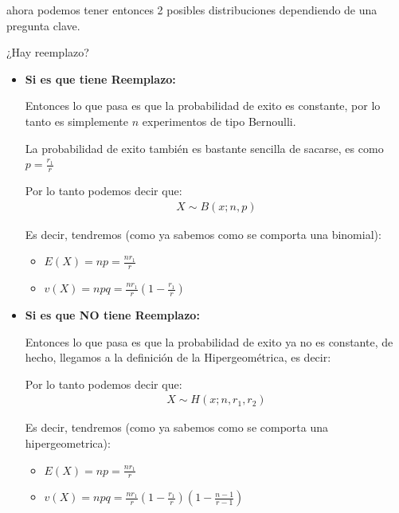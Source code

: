 \documentclass[12pt, fleqn]{report}                             %
\theoremstyle{break}                                            %
\newcommand{\Wrap}[1]           {\left( #1 \right)}             %
\begin{document}
                ahora podemos tener
                entonces 2 posibles distribuciones dependiendo de una pregunta clave.

                ¿Hay reemplazo?

                \begin{itemize}
                    \item 
                        \textbf{Si es que tiene Reemplazo:}

                        Entonces lo que pasa es que la probabilidad de exito es constante, por 
                        lo tanto es simplemente $n$ experimentos de tipo Bernoulli.

                        La probabilidad de exito también es bastante sencilla de sacarse, es
                        como $p = \frac{r_1}{r}$

                        Por lo tanto podemos decir que:
                        \begin{align*}
                            X \sim B(x; n, p)
                        \end{align*}

                        Es decir, tendremos (como ya sabemos como se comporta una binomial):
                        \begin{itemize}
                            \item $E(X) = np = \frac{nr_1}{r}$
                            \item $v(X) = npq = \frac{nr_1}{r}\Wrap{1 - \frac{r_1}{r}}$
                        \end{itemize}

                    \item 
                        \textbf{Si es que NO tiene Reemplazo:}

                        Entonces lo que pasa es que la probabilidad de exito ya no es constante,
                        de hecho, llegamos a la definición de la Hipergeométrica, es decir:

                        Por lo tanto podemos decir que:
                        \begin{align*}
                            X \sim H(x; n, r_1, r_2)
                        \end{align*}

                        Es decir, tendremos (como ya sabemos como se comporta una hipergeometrica):
                        \begin{itemize}
                            \item $E(X) = np = \frac{nr_1}{r}$
                            \item $v(X) = npq = \frac{nr_1}{r}\Wrap{1 - \frac{r_1}{r}}\Wrap{1 - \frac{n-1}{r-1}}$
                        \end{itemize}

                \end{itemize}
\end{document}

